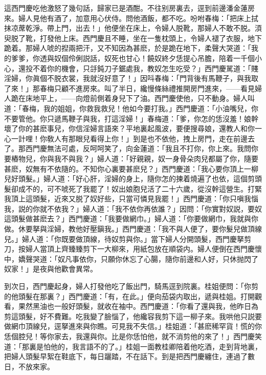 這西門慶吃他激怒了幾句話，歸家已是酒酣。不往别房裏去，逕到前邊潘金蓮房來。婦人見他有酒了，加意用心伏侍。問他酒飯，都不吃。吩咐春梅：「把床上拭抹凉蓆乾淨。帶上門，出去！」他便坐在床上，令婦人脱靴，那婦人不敢不脱。湏臾脱了靴，打發他上床。西門慶且不睡，坐在一隻枕頭上，令婦人褪了衣服，地下跪着。那婦人唬的揑兩把汗，又不知因為甚麽，於是跪在地下，柔聲大哭道：「我的爹爹，你透與奴個伶俐説話，奴死也甘心！饒奴終夕恁提心吊膽，陪着一千個小心，還投不着你的機會，只㧱鈍刀子鋸處我，教奴怎生吃受？」西門慶駡道：「賤淫婦，你眞個不脱衣裳，我就沒好意了！」因呌春梅：「門背後有馬鞭子，與我取了來！」那春梅只顧不進房來。叫了半日，纔慢條絲禮推開房門進來，——看見婦人跪在床地平上，——向燈前側着身兒下了油。西門慶使他，只不動身。婦人叫道：「春梅，我的姐姐，你救我救兒！他如今要打我。」西門慶道：「小油嘴兒，你不要管他。你只遞馬鞭子與我，打這淫婦！」春梅道：「爹，你怎的恁沒羞！娘幹壞了你的甚麽事兒，你信淫婦言語來？平地裏起風波，要便搜尋娘，還教人和你一心一計哩！你敎人有那眼兒看得上你！」到是也不依他，拽上房門，走在前邊去了。那西門慶無法可處，反呵呵笑了，向金蓮道：「我且不打你，你上來。我問你要樁物兒，你與我不與我？」婦人道：「好親親，奴一身骨朵肉兒都屬了你，隨要甚麽，奴無有不依隨的。不知你心裏要甚麽兒？」西門慶道：「我心要你頂上一柳兒好頭髮。」婦人道：「好心肝，淫婦的身上，隨你怎的揀着燒遍了也依，這個剪頭髮卻成不的，可不唬死了我罷了！奴出娘胞兒活了二十六歲，從沒幹這營生。打緊我頂上這頭髮，近來又脱了奴好些，只當可憐見我罷！」西門慶道：「你只嗔我惱我，説的你就不依我？」婦人道：「我不依你再依誰？」因問：「你實對奴説，要奴這頭髮做甚麽去？」西門慶道：「我要做網巾。」婦人道：「你要做網巾，我就與你做。休要拏與淫婦，教他好壓鎭我。」西門慶道：「我不與人便了，要你髮兒做頂線兒。」婦人道：「你既要做頂線，待奴剪與你。」當下婦人分開頭髮，西門慶拏剪刀，按婦人當頂上齊臻臻剪下一大柳來，用紙包放在順袋内。婦人便倒在西門慶懷中，嬌聲哭道：「奴凡事依你，只願你休忘了心腸，隨你前邊和人好，只休抛閃了奴家！」是夜與他歡會異常。

到次日，西門慶起身，婦人打發他吃了飯出門，騎馬逕到院裏。桂姐便問：「你剪的他頭髮在那裏？」西門慶道：「有，在此。」便向茄袋内取出，遞與桂姐。打開觀看，果然黑油也一般好頭髮，就收在袖中。西門慶道：「你看了還與我，他昨日為剪這頭髮，好不費難。吃我變了臉惱了，他纔容我剪下這一柳子來。我哄他只説要做網巾頂線兒，逕拏進來與你瞧。可見我不失信。」桂姐道：「甚麽稀罕貨！慌的你恁個腔兒！等你家去，我還與你。比是你恁怕他，就不消剪他的來了！」西門慶笑道：「那裏是怕他的，我言語不的了。」桂姐一面教桂卿陪着他吃酒，走到背地裏，把婦人頭髮早絮在鞋底下，每日躧踏，不在話下。到是把西門慶纏住，連過了數日，不放來家。

